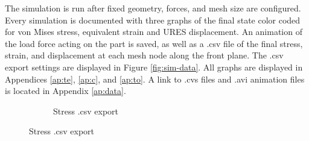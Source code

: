 \documentclass[12pt, letterpaper]{article}
\begin{document}
The simulation is run after fixed geometry, forces, and mesh size are configured. 
Every simulation is documented with three graphs of the final state color coded for von Mises stress, equivalent strain and URES displacement. An animation of the load force acting on the part is saved, as well as a .csv file of the final stress, strain, and displacement at each mesh node along the front plane. The .csv export settings are displayed in Figure \ref{fig:sim-data}. All graphs are displayed in Appendices \ref{ap:te}, \ref{ap:c}, and \ref{ap:to}. A link to .cvs files and .avi animation files is located in Appendix \ref{ap:data}. 

\begin{figure}[H]
	\centering
	\caption{Data Export}
	\label{fig:sim-data}
	\begin{subfigure}[t]{.3\linewidth}
		\caption{Stress .csv export}

\end{subfigure}
\end{figure}
\end{document}

